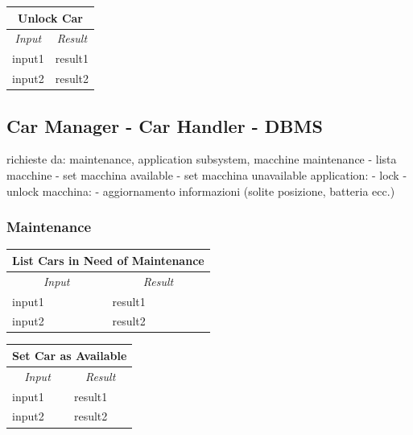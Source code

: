 \documentclass[english]{article}
\begin{document}
\begin{center}
	\begin{tabular}{ | m{6cm} | m{6cm} | }
		\hline
		\multicolumn{2}{|c|}{\textbf{Unlock Car}} \\
		\hline
		\multicolumn{1}{|c|}{\textit{Input}} & \multicolumn{1}{c|}{\textit{Result}} \\
		\hline
		input1 & result1 \\
		\hline
		input2 & result2 \\
		\hline
	\end{tabular}
\end{center}

\subsection{Car Manager - Car Handler - DBMS}
richieste da: maintenance, application subsystem, macchine
maintenance
- lista macchine
- set macchina available
- set macchina unavailable
application:
- lock
- unlock
macchina:
- aggiornamento informazioni (solite posizione, batteria ecc.)

\subsubsection{Maintenance}
\begin{center}
	\begin{tabular}{ | m{6cm} | m{6cm} | }
		\hline
		\multicolumn{2}{|c|}{\textbf{List Cars in Need of Maintenance}} \\
		\hline
		\multicolumn{1}{|c|}{\textit{Input}} & \multicolumn{1}{c|}{\textit{Result}} \\
		\hline
		input1 & result1 \\
		\hline
		input2 & result2 \\
		\hline
	\end{tabular}
\end{center}

\begin{center}
	\begin{tabular}{ | m{6cm} | m{6cm} | }
		\hline
		\multicolumn{2}{|c|}{\textbf{Set Car as Available}} \\
		\hline
		\multicolumn{1}{|c|}{\textit{Input}} & \multicolumn{1}{c|}{\textit{Result}} \\
		\hline
		input1 & result1 \\
		\hline
		input2 & result2 \\
		\hline
	\end{tabular}
\end{center}
\end{document}

